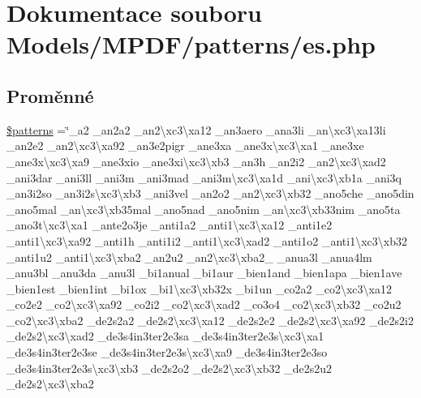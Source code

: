 \hypertarget{es_8php}{\section{Dokumentace souboru Models/\-M\-P\-D\-F/patterns/es.php}
\label{es_8php}
}
\subsection*{Proměnné}
\begin{DoxyCompactItemize}
\item 
\hyperlink{es_8php_a99c668c59ad650ca9b31ad5313dc5720}{\$patterns} =\char`\"{}\-\_\-a2 \-\_\-an2a2 \-\_\-an2\textbackslash{}xc3\textbackslash{}xa12 \-\_\-an3aero \-\_\-ana3li \-\_\-an\textbackslash{}xc3\textbackslash{}xa13li \-\_\-an2e2 \-\_\-an2\textbackslash{}xc3\textbackslash{}xa92 \-\_\-an3e2pigr \-\_\-ane3xa \-\_\-ane3x\textbackslash{}xc3\textbackslash{}xa1 \-\_\-ane3xe \-\_\-ane3x\textbackslash{}xc3\textbackslash{}xa9 \-\_\-ane3xio \-\_\-ane3xi\textbackslash{}xc3\textbackslash{}xb3 \-\_\-an3h \-\_\-an2i2 \-\_\-an2\textbackslash{}xc3\textbackslash{}xad2 \-\_\-ani3dar \-\_\-ani3ll \-\_\-ani3m \-\_\-ani3mad \-\_\-ani3m\textbackslash{}xc3\textbackslash{}xa1d \-\_\-ani\textbackslash{}xc3\textbackslash{}xb1a \-\_\-ani3q \-\_\-an3i2so \-\_\-an3i2s\textbackslash{}xc3\textbackslash{}xb3 \-\_\-ani3vel \-\_\-an2o2 \-\_\-an2\textbackslash{}xc3\textbackslash{}xb32 \-\_\-ano5che \-\_\-ano5din \-\_\-ano5mal \-\_\-an\textbackslash{}xc3\textbackslash{}xb35mal \-\_\-ano5nad \-\_\-ano5nim \-\_\-an\textbackslash{}xc3\textbackslash{}xb33nim \-\_\-ano5ta \-\_\-ano3t\textbackslash{}xc3\textbackslash{}xa1 \-\_\-ante2o3je \-\_\-anti1a2 \-\_\-anti1\textbackslash{}xc3\textbackslash{}xa12 \-\_\-anti1e2 \-\_\-anti1\textbackslash{}xc3\textbackslash{}xa92 \-\_\-anti1h \-\_\-anti1i2 \-\_\-anti1\textbackslash{}xc3\textbackslash{}xad2 \-\_\-anti1o2 \-\_\-anti1\textbackslash{}xc3\textbackslash{}xb32 \-\_\-anti1u2 \-\_\-anti1\textbackslash{}xc3\textbackslash{}xba2 \-\_\-an2u2 \-\_\-an2\textbackslash{}xc3\textbackslash{}xba2\-\_\- \-\_\-anua3l \-\_\-anua4lm \-\_\-anu3bl \-\_\-anu3da \-\_\-anu3l \-\_\-bi1anual \-\_\-bi1aur \-\_\-bien1and \-\_\-bien1apa \-\_\-bien1ave \-\_\-bien1est \-\_\-bien1int \-\_\-bi1ox \-\_\-bi1\textbackslash{}xc3\textbackslash{}xb32x \-\_\-bi1un \-\_\-co2a2 \-\_\-co2\textbackslash{}xc3\textbackslash{}xa12 \-\_\-co2e2 \-\_\-co2\textbackslash{}xc3\textbackslash{}xa92 \-\_\-co2i2 \-\_\-co2\textbackslash{}xc3\textbackslash{}xad2 \-\_\-co3o4 \-\_\-co2\textbackslash{}xc3\textbackslash{}xb32 \-\_\-co2u2 \-\_\-co2\textbackslash{}xc3\textbackslash{}xba2 \-\_\-de2s2a2 \-\_\-de2s2\textbackslash{}xc3\textbackslash{}xa12 \-\_\-de2s2e2 \-\_\-de2s2\textbackslash{}xc3\textbackslash{}xa92 \-\_\-de2s2i2 \-\_\-de2s2\textbackslash{}xc3\textbackslash{}xad2 \-\_\-de3s4in3ter2e3sa \-\_\-de3s4in3ter2e3s\textbackslash{}xc3\textbackslash{}xa1 \-\_\-de3s4in3ter2e3se \-\_\-de3s4in3ter2e3s\textbackslash{}xc3\textbackslash{}xa9 \-\_\-de3s4in3ter2e3so \-\_\-de3s4in3ter2e3s\textbackslash{}xc3\textbackslash{}xb3 \-\_\-de2s2o2 \-\_\-de2s2\textbackslash{}xc3\textbackslash{}xb32 \-\_\-de2s2u2 \-\_\-de2s2\textbackslash{}xc3\textbackslash{}xba2 
\end{DoxyCompactItemize}
